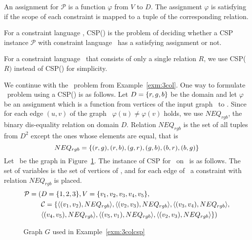 An assignment for \(\mathcal{P}\) is a function \(\varphi\) from \(V\) to \(D\)\@. The assignment
\(\varphi\) is satisfying if the scope of each constraint is
mapped to a tuple of the corresponding relation.

\begin{defi}
For a constraint language \mrelset, CSP(\mrelset) is the problem of deciding 
whether a CSP instance \(\mathcal{P}\) with constraint language \mrelset\
has a satisfying assignment or not.
\end{defi}

For a constraint language \mrelset\ that consists of only a single relation \(R\),
we use CSP(\(R)\) instead of CSP(\mrelset) for simplicity.

\begin{example}[\tcoloring]\label{exm:3colcsp}
We continue with the \tcoloring\ problem from Example~\ref{exm:3col}.
One way to formulate \tcoloring\ problem using a CSP(\mrelset) is as follows.
Let  \(D=\{{r,g,b}\}\) be the domain and
let \(\varphi\) be an assignment which is a function from vertices of the input graph \mG\ to \mD\@.
Since for each edge \((u,v)\) of the graph \mG\ \(\varphi(u)\neq\varphi(v)\) holds,
we use \(NEQ_{rgb}\), the binary dis-equality relation on domain \(D\)\@. Relation \(NEQ_{rgb}\) is the set of all tuples from 
\(D^2\) except the ones whose elements are equal, that is
\[NEQ_{rgb}=\{{(r,g),(r,b),(g,r),(g,b),(b,r), (b,g)}\}\]
Let \mG\ be the graph in Figure~\ref{fig:sample}. The instance of 
CSP for \tcoloring\ on \mG\ is as follows. The set of variables is the set of vertices of \mG,
and for each edge of \mG\ a constraint with relation \(NEQ_{rgb}\) is placed.
\begin{align*}
\mathcal{P}=(&D=\{{1,2,3}\},V=\{{v_1,v_2,v_3,v_4,v_5}\}, \\
&\mathcal{C}=\{\langle (v_1,v_2),NEQ_{rgb} \rangle, \langle (v_2,v_3),NEQ_{rgb} \rangle,\langle (v_3,v_4),NEQ_{rgb} \rangle,\\
&\langle (v_4,v_5),NEQ_{rgb} \rangle, \langle (v_5,v_1),NEQ_{rgb} \rangle,
\langle (v_2,v_3),NEQ_{rgb} \rangle\})
\end{align*}
\end{example}
\begin{figure}
\centering

\caption{Graph \ensuremath{G} used in Example~\ref{exm:3colcsp}}
\label{fig:sample}
\end{figure}


